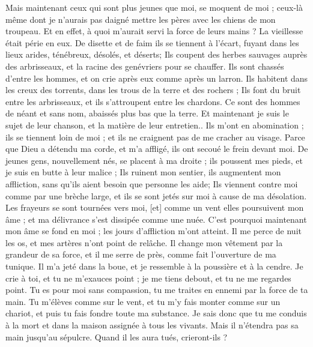 \begin{multicols}{2}
\VerseOne{}Mais maintenant ceux qui sont plus jeunes que moi, se moquent de moi ; ceux-là même dont je n'aurais pas daigné mettre les pères avec les chiens de mon troupeau.
Et en effet, à quoi m'aurait servi la force de leurs mains ? La vieillesse était périe en eux. 
De disette et de faim ils se tiennent à l'écart, fuyant dans les lieux arides, ténébreux, désolés, et déserts;
Ils coupent des herbes sauvages auprès des arbrisseaux, et la racine des genévriers pour se chauffer. 
Ils sont chassés d'entre les hommes, et on crie après eux comme après un larron. 
Ils habitent dans les creux des torrents, dans les trous de la terre et des rochers ;
Ils font du bruit entre les arbrisseaux, et ils s'attroupent entre les chardons. 
Ce sont des hommes de néant et sans nom, abaissés plus bas que la terre. 
Et maintenant je suis le sujet de leur chanson, et la matière de leur entretien..
Ils m'ont en abomination ; ils se tiennent loin de moi ; et ils ne craignent pas de me cracher au visage. 
Parce que Dieu a détendu ma corde, et m'a affligé, ils ont secoué le frein devant moi. 
De jeunes gens, nouvellement nés, se placent à ma droite ; ils poussent mes pieds, et je suis en butte à leur malice ;
Ils ruinent mon sentier, ils augmentent mon affliction, sans qu'ils aient besoin que personne les aide;
Ils viennent contre moi comme par une brèche large, et ils se sont jetés sur moi à cause de ma désolation. 
Les frayeurs se sont tournées vers moi, [et] comme un vent elles poursuivent mon âme ; et ma délivrance s'est dissipée comme une nuée.
C'est pourquoi maintenant mon âme se fond en moi ; les jours d'affliction m'ont atteint. 
Il me perce de nuit les os, et mes artères n'ont point de relâche. 
Il change mon vêtement par la grandeur de sa force, et il me serre de près, comme fait l'ouverture de ma tunique.
Il m'a jeté dans la boue, et je ressemble à la poussière et à la cendre. 
Je crie à toi, et tu ne m'exauces point ; je me tiens debout, et tu ne me regardes point. 
Tu es pour moi sans compassion, tu me traites en ennemi par la force de ta main. 
Tu m'élèves comme sur le vent, et tu m'y fais monter comme sur un chariot, et puis tu fais fondre toute ma substance. 
Je sais donc que tu me conduis à la mort et dans la maison assignée à tous les vivants.
Mais il n'étendra pas sa main jusqu'au sépulcre. Quand il les aura tués, crieront-ils ? 

\end{multicols}
